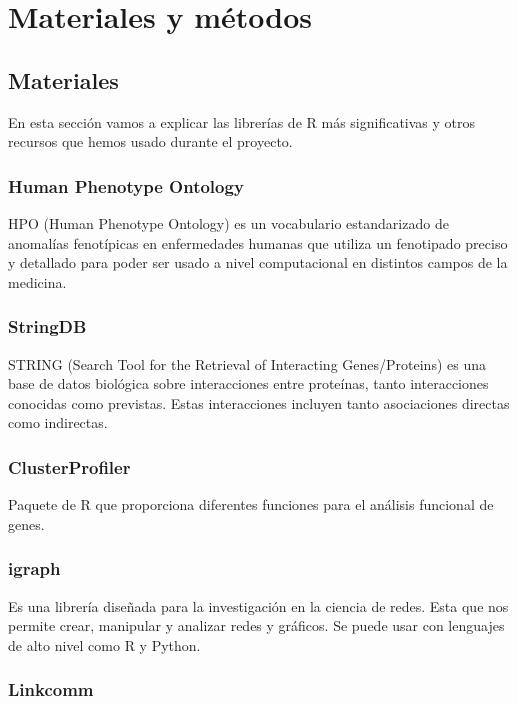 \section{Materiales y métodos}

\subsection{Materiales}

En esta sección vamos a explicar las librerías de R más significativas y otros recursos que hemos usado durante el proyecto.

\subsubsection{Human Phenotype Ontology}

HPO (Human Phenotype Ontology)\cite{HPO} es un vocabulario estandarizado de anomalías fenotípicas en enfermedades humanas que utiliza un fenotipado preciso y detallado para poder ser usado a nivel computacional en distintos campos de la medicina.


\subsubsection{StringDB}

STRING (Search Tool for the Retrieval of Interacting Genes/Proteins) \cite{STRING} es una base de datos biológica sobre interacciones entre proteínas, tanto interacciones conocidas como previstas. Estas interacciones incluyen tanto asociaciones directas como indirectas.

\subsubsection{ClusterProfiler}

Paquete de R que proporciona diferentes funciones para el análisis funcional de genes.

\subsubsection{igraph}

Es una librería diseñada para la investigación en la ciencia de redes. Esta que nos permite crear, manipular y analizar redes y gráficos. Se puede usar con lenguajes de alto nivel como R y Python.

\subsubsection{Linkcomm}

